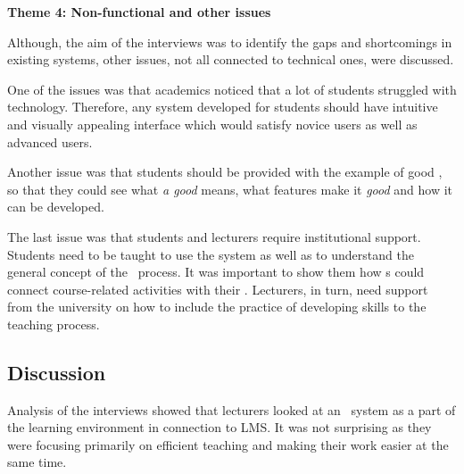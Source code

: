 \textbf{Theme 4: Non-functional and other issues}

Although, the aim of the interviews was to identify the gaps and shortcomings in
existing systems, other issues, not all connected to technical ones, were
discussed.

One of the issues was that academics noticed that a lot of students struggled
with technology. Therefore, any system developed for students should have
intuitive and visually appealing interface which would satisfy novice users as
well as advanced users.



Another issue was that students should be provided with the example of good
\ep, so that they could see what \textit{a good \ep} means, what features make
it \textit{good} and how it can be developed.


The last issue was that students and lecturers require institutional support.
Students need to be taught to use the system as well as to understand the
general concept of the \ep~process. It was important to show them how \ep s
could connect course-related activities with their \LLLsn. Lecturers, in turn,
need support from the university on how to include the practice of developing
\LLLs skills to the teaching process.

 
\subsection{Discussion}
Analysis of the interviews showed that lecturers looked at an \ep~system as a
part of the learning environment in connection to LMS. It was not surprising as
they were focusing primarily on efficient teaching and making their work easier
at the same time.

